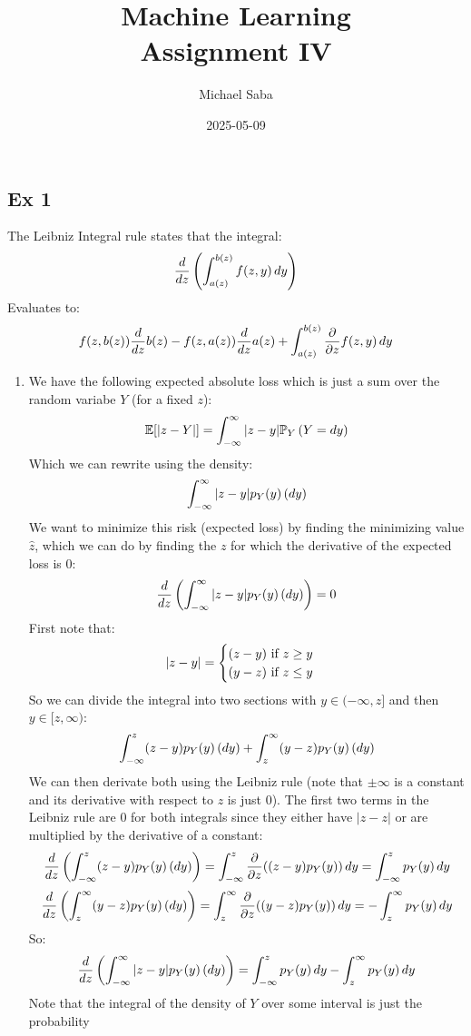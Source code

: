\documentclass[12pt]{article}
\title{
    \Huge Machine Learning \\
    \Large Assignment IV
}
\date{2025-05-09}
\author{Michael Saba}
\begin{document}
\maketitle
\newpage
\setlength{\parindent}{0pt}

\subsection*{Ex 1}

The Leibniz Integral rule states that
the integral:
\[ \dfrac{d}{dz}
\left( \int_{a(z)}^{b(z)} f(z, y) \, dy \right) \]
Evaluates to:
\[ f(z, b(z))\dfrac{d}{dz}b(z) 
- f(z, a(z))\dfrac{d}{dz}a(z)
+ \int_{a(z)}^{b(z)} \dfrac{\partial }{\partial z}
f(z, y) \, dy \]

\begin{enumerate}[label = \letters]
\item 
We have the following expected absolute loss
which is just a sum over the random variabe
$Y$ (for a fixed $z$):
\[ \mathbb{E}[|z - Y|] 
= \int_{-\infty}^{\infty} |z - y|\mathbb{P}_Y \, (Y = dy) \]
Which we can rewrite using the density:
\[ \int_{-\infty}^{\infty} |z - y|p_Y(y) \, (dy) \]
We want to minimize this risk (expected loss)
by finding the minimizing value $\hat{z}$,
which we can do by finding the $z$
for which the derivative of the expected loss
is $0$:
\[ \dfrac{d}{dz}\left( \int_{-\infty}^{\infty} |z - y|p_Y(y) \, (dy)  \right) = 0 \]
First note that:
\[ |z-y| = \begin{cases} (z-y) \text{ if } z \geq y \\
(y-z) \text{ if } z \leq y \end{cases} \]
So we can divide the integral into two sections
with $y \in (-\infty, z]$
and then $y \in [z, \infty)$:
\[ \int_{-\infty}^{z} (z-y)p_Y(y) \, (dy)
+ \int_{z}^{\infty} (y-z)p_Y(y) \, (dy) \]
We can then derivate both using the Leibniz rule
(note that $\pm\infty$ is a constant
and its derivative with respect to $z$ is just 0).
The first two terms in the Leibniz rule
are $0$ for both integrals
since they either have $|z-z|$
or are multiplied by the derivative of a constant:
\[ \dfrac{d}{dz}\left( 
\int_{-\infty}^{z} (z - y)p_Y(y) \, (dy) \right)
= \int_{-\infty}^{z} \dfrac{\partial }{\partial z}
((z - y)p_Y(y)) \, dy
= \int_{-\infty}^{z} p_Y(y) \, dy \]
\[ \dfrac{d}{dz}\left( 
\int_{z}^{\infty} (y - z)p_Y(y) \, (dy) \right)
= \int_{z}^{\infty} \dfrac{\partial }{\partial z}
((y - z)p_Y(y)) \, dy
= -\int_{z}^{\infty} p_Y(y) \, dy \]
So:
\[ \dfrac{d}{dz}\left( \int_{-\infty}^{\infty} |z - y|p_Y(y) \, (dy)  \right) = 
\int_{-\infty}^{z} p_Y(y) \, dy
-\int_{z}^{\infty} p_Y(y) \, dy\]
Note that the integral of the density of $Y$
over some interval is just the probability

\end{enumerate}
\end{document}
